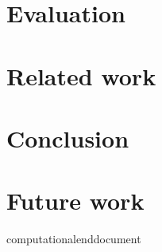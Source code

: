 \documentclass[10pt,a4paper,DIV=11]{scrreprt}
\begin{document}
\chapter{Evaluation}
\chapter{Related work}
\chapter{Conclusion}
\chapter{Future work}


\newpage


\listoffigures
\listoftables
\listofalgorithms
\lstlistoflistings

\newpage





computationalend{document}
\end{document}
